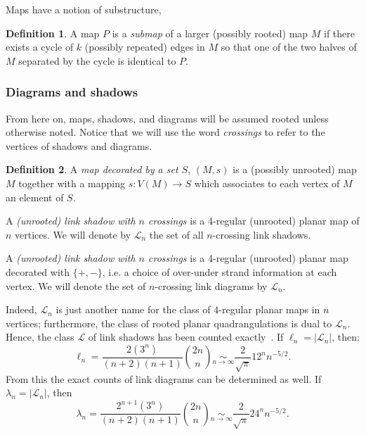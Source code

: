 \documentclass[amsmath,longbibliography,secnumarabic,floatfix,amssymb,nofootinbib,nobibnotes,letterpaper,11pt,tightenlines,notitlepage,showkeys,showlabels]{amsart}%
\newcommand{\LinkDia}{\mathcal{L}}
\newcommand{\linkdia}{\lambda}
\newcommand{\LinkShad}{\mathscr{L}}
\newcommand{\linkshad}{\ell}
\theoremstyle{definition}
\newtheorem*{definition}{Definition}
\begin{document}
Maps have a notion of substructure,

\begin{definition}
  A map $P$ is a \emph{submap} of a larger (possibly rooted) map $M$
  if there exists a cycle of $k$ (possibly repeated) edges in $M$ so
  that one of the two halves of $M$ separated by the cycle is
  identical to $P$.
\end{definition}

\subsubsection{Diagrams and shadows}
\label{sec:shadowdefs}

From here on, maps, shadows, and diagrams will be assumed rooted
unless otherwise noted. Notice that we will use the word
\emph{crossings} to refer to the vertices of shadows and diagrams.

\begin{definition} 
  A \emph{map decorated by a set $S$}, $(M, s)$ is a (possibly unrooted)
  map $M$ together with a mapping $s: V(M) \to S$ which associates to
  each vertex of $M$ an element of $S$.

  A \emph{(unrooted) link shadow with $n$ crossings} is a 4-regular
  (unrooted) planar map of $n$ vertices. We will denote by
  $\LinkShad_n$ the set of all $n$-crossing link shadows.

  A \emph{(unrooted) link shadow with $n$ crossings} is a 4-regular
  (unrooted) planar map decorated with $\{+,-\}$, i.e. a choice of
  over-under strand information at each vertex. We will denote the set
  of $n$-crossing link diagrams by $\LinkDia_n$.
\end{definition}

Indeed, $\LinkShad_n$ is just another name for the class of 4-regular
planar maps in $n$ vertices; furthermore, the class of rooted planar
quadrangulations is dual to $\LinkShad_n$.  Hence, the class
$\LinkShad$ of link shadows has been counted
exactly~\cite{chapman2011surveys}. If $\linkshad_n = |\LinkShad_n|$,
then:
\[ \linkshad_n = \frac{2(3^n)}{(n+2)(n+1)}\binom{2n}{n}
\mathop{\sim}\limits_{n \to \infty} \frac{2}{\sqrt\pi}12^nn^{-5/2}. \]
From this the exact counts of link diagrams can be determined
as well. If $\linkdia_n = |\LinkDia_n|$, then
\[ \linkdia_n = \frac{2^{n+1}(3^n)}{(n+2)(n+1)}\binom{2n}{n}
\mathop{\sim}\limits_{n \to \infty} \frac{2}{\sqrt\pi}24^nn^{-5/2}. \]
\end{document}
